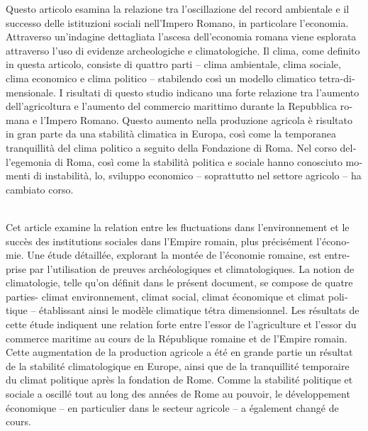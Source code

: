 \begin{myabstract}	
	\foreignlanguage{italian}{Questo articolo esamina la relazione tra l'oscillazione del record ambientale e il successo delle istituzioni sociali nell'Impero Romano, in particolare l'economia. Attraverso un'indagine dettagliata l'ascesa dell'economia romana viene esplorata  attraverso l'uso di evidenze archeologiche e climatologiche. Il clima, come definito in questa articolo, consiste di quattro parti – clima ambientale, clima sociale, clima economico e clima politico – stabilendo così un modello climatico tetra-dimensionale. I risultati di questo studio indicano una forte relazione tra l'aumento dell'agricoltura e l'aumento del commercio marittimo durante la Repubblica romana e l'Impero Romano. Questo aumento nella produzione agricola è risultato in gran parte da una stabilità climatica in Europa, così come la temporanea tranquillità del clima politico a seguito della Fondazione di Roma. Nel corso dell'egemonia di Roma, così come la stabilità politica e sociale hanno conosciuto momenti di instabilità, lo, sviluppo economico – soprattutto nel settore agricolo – ha cambiato corso.}
	\\[1em]
	
	\hspace{2em}\\\noindent%
	\foreignlanguage{french}{Cet article examine la relation entre les fluctuations dans l'environnement et le succès des institutions sociales dans l'Empire romain, plus précisément l'économie. Une étude détaillée, explorant la montée de l'économie romaine, est entreprise par l'utilisation de preuves archéologiques et climatologiques. La notion de climatologie, telle qu’on définit dans le présent document, se compose de quatre parties- climat environnement, climat social, climat économique et climat politique – établissant ainsi le modèle climatique tétra dimensionnel. Les résultats de cette étude indiquent une relation forte entre l'essor de l'agriculture et l'essor du commerce maritime au cours de la République romaine et de l'Empire romain. Cette augmentation de la production agricole a été en grande partie un résultat de la stabilité climatologique en Europe, ainsi que de la tranquillité temporaire du climat politique après la fondation de Rome. Comme la stabilité politique et sociale a oscillé tout au long des années de Rome au pouvoir, le développement économique – en particulier dans le secteur agricole – a également changé de cours.}\\[1em]
\end{myabstract}
	



	\printbibliography[heading=subbibnumbered] 

	\label{davis:lastpage}
\closingarticle

